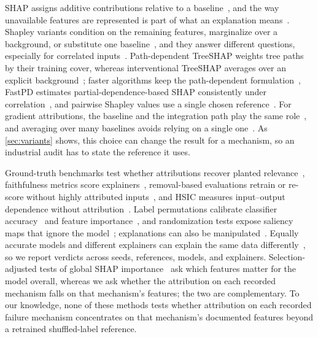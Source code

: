 \documentclass[conference]{IEEEtran}
\begin{document}
SHAP assigns additive contributions relative to a baseline~\cite{lundberg2017shap}, and the way unavailable features are represented is part of what an explanation means~\cite{covert2021explaining}. Shapley variants condition on the remaining features, marginalize over a background, or substitute one baseline~\cite{sundararajan2020many}, and they answer different questions, especially for correlated inputs~\cite{chen2023algorithms,chen2020true,aas2021explaining,kumar2020problems}. Path-dependent TreeSHAP weights tree paths by their training cover, whereas interventional TreeSHAP averages over an explicit background~\cite{lundberg2020treeshap}; faster algorithms keep the path-dependent formulation~\cite{yu2022linear,wettenstein2026quadrature}, FastPD estimates partial-dependence-based SHAP consistently under correlation~\cite{liu2025fastpd}, and pairwise Shapley values use a single chosen reference~\cite{xu2025pairwise}. For gradient attributions, the baseline and the integration path play the same role~\cite{sturmfels2020visualizing}, and averaging over many baselines avoids relying on a single one~\cite{erion2021improving}. As \cref{sec:variants} shows, this choice can change the result for a mechanism, so an industrial audit has to state the reference it uses.

Ground-truth benchmarks test whether attributions recover planted relevance~\cite{liu2021synthetic,lee2025xaiunits,yang2019bam,arras2022clevr}, faithfulness metrics score explainers~\cite{agarwal2022openxai,li2024dual}, removal-based evaluations retrain or re-score without highly attributed inputs~\cite{hooker2019roar,rong2022road}, and HSIC measures input--output dependence without attribution~\cite{daveiga2015global}. Label permutations calibrate classifier accuracy~\cite{ojala2010permutation} and feature importance~\cite{altmann2010permutation}, and randomization tests expose saliency maps that ignore the model~\cite{adebayo2018sanity,kindermans2019unreliability}; explanations can also be manipulated~\cite{slack2020fooling}. Equally accurate models and different explainers can explain the same data differently~\cite{fisher2019all,black2022multiplicity,krishna2024disagreement}, so we report verdicts across seeds, references, models, and explainers. Selection-adjusted tests of global SHAP importance~\cite{kim2025phitest} ask which features matter for the model overall, whereas we ask whether the attribution on each recorded mechanism falls on that mechanism's features; the two are complementary. To our knowledge, none of these methods tests whether attribution on each recorded failure mechanism concentrates on that mechanism's documented features beyond a retrained shuffled-label reference.
\end{document}
